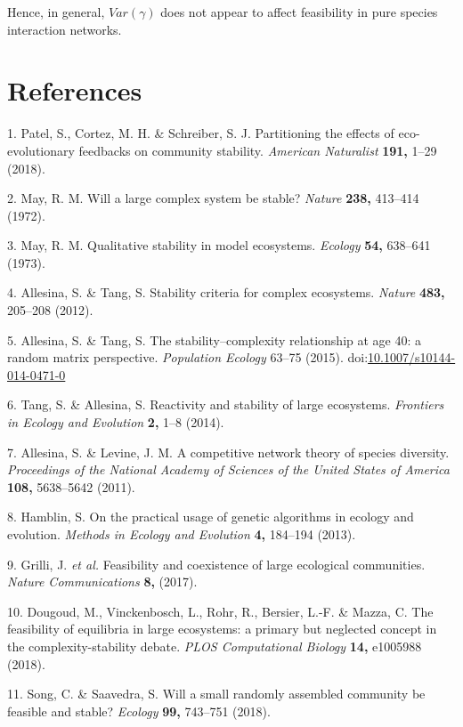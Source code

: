 \documentclass[]{article}
\begin{document}
Hence, in general, \(Var(\gamma)\) does not appear to affect feasibility
in pure species interaction networks.

\section*{References}\label{references}

\hypertarget{refs}{}
\hypertarget{ref-Patel2018}{}
1. Patel, S., Cortez, M. H. \& Schreiber, S. J. Partitioning the effects
of eco-evolutionary feedbacks on community stability. \emph{American
Naturalist} \textbf{191,} 1--29 (2018).

\hypertarget{refs}{}
\hypertarget{ref-May1972}{}
2. May, R. M. Will a large complex system be stable? \emph{Nature}
\textbf{238,} 413--414 (1972).

\hypertarget{ref-May1973}{}
3. May, R. M. Qualitative stability in model ecosystems. \emph{Ecology}
\textbf{54,} 638--641 (1973).

\hypertarget{ref-Allesina2012}{}
4. Allesina, S. \& Tang, S. Stability criteria for complex ecosystems.
\emph{Nature} \textbf{483,} 205--208 (2012).

\hypertarget{ref-Allesina2015a}{}
5. Allesina, S. \& Tang, S. The stability--complexity relationship at
age 40: a random matrix perspective. \emph{Population Ecology} 63--75
(2015).
doi:\href{https://doi.org/10.1007/s10144-014-0471-0}{10.1007/s10144-014-0471-0}

\hypertarget{ref-Tang2014b}{}
6. Tang, S. \& Allesina, S. Reactivity and stability of large
ecosystems. \emph{Frontiers in Ecology and Evolution} \textbf{2,} 1--8
(2014).

\hypertarget{ref-Allesina2011}{}
7. Allesina, S. \& Levine, J. M. A competitive network theory of species
diversity. \emph{Proceedings of the National Academy of Sciences of the
United States of America} \textbf{108,} 5638--5642 (2011).

\hypertarget{ref-Hamblin2013}{}
8. Hamblin, S. On the practical usage of genetic algorithms in ecology
and evolution. \emph{Methods in Ecology and Evolution} \textbf{4,}
184--194 (2013).

\hypertarget{ref-Grilli2017}{}
9. Grilli, J. \emph{et al.} Feasibility and coexistence of large
ecological communities. \emph{Nature Communications} \textbf{8,} (2017).

\hypertarget{ref-Dougoud2018}{}
10. Dougoud, M., Vinckenbosch, L., Rohr, R., Bersier, L.-F. \& Mazza, C.
The feasibility of equilibria in large ecosystems: a primary but
neglected concept in the complexity-stability debate. \emph{PLOS
Computational Biology} \textbf{14,} e1005988 (2018).

\hypertarget{ref-Song2018}{}
11. Song, C. \& Saavedra, S. Will a small randomly assembled community be
feasible and stable? \emph{Ecology} \textbf{99,} 743--751 (2018).
\end{document}
